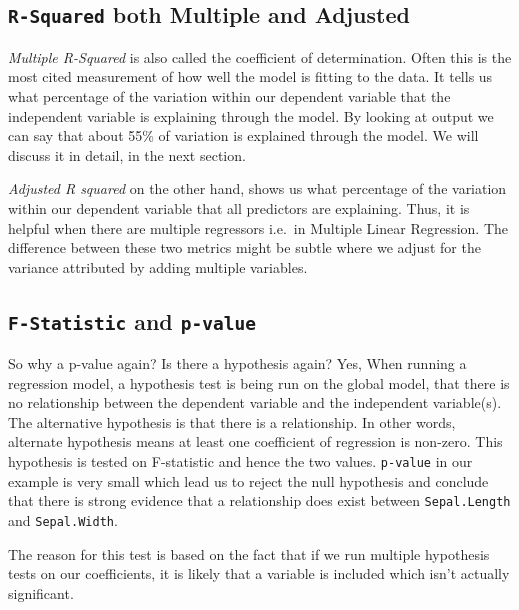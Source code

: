 \documentclass[
]{book}
\begin{document}
\hypertarget{r-squared-both-multiple-and-adjusted}{%
\subsection{\texorpdfstring{\texttt{R-Squared} both Multiple and Adjusted}{R-Squared both Multiple and Adjusted}}\label{r-squared-both-multiple-and-adjusted}}

\emph{Multiple R-Squared} is also called the coefficient of determination. Often this is the most cited measurement of how well the model is fitting to the data. It tells us what percentage of the variation within our dependent variable that the independent variable is explaining through the model. By looking at output we can say that about 55\% of variation is explained through the model. We will discuss it in detail, in the next section.

\emph{Adjusted R squared} on the other hand, shows us what percentage of the variation within our dependent variable that all predictors are explaining. Thus, it is helpful when there are multiple regressors i.e.~in Multiple Linear Regression. The difference between these two metrics might be subtle where we adjust for the variance attributed by adding multiple variables.

\hypertarget{f-statistic-and-p-value}{%
\subsection{\texorpdfstring{\texttt{F-Statistic} and \texttt{p-value}}{F-Statistic and p-value}}\label{f-statistic-and-p-value}}

So why a p-value again? Is there a hypothesis again? Yes, When running a regression model, a hypothesis test is being run on the global model, that there is no relationship between the dependent variable and the independent variable(s). The alternative hypothesis is that there is a relationship. In other words, alternate hypothesis means at least one coefficient of regression is non-zero. This hypothesis is tested on F-statistic and hence the two values. \texttt{p-value} in our example is very small which lead us to reject the null hypothesis and conclude that there is strong evidence that a relationship does exist between \texttt{Sepal.Length} and \texttt{Sepal.Width}.

The reason for this test is based on the fact that if we run multiple hypothesis tests on our coefficients, it is likely that a variable is included which isn't actually significant.
\end{document}
